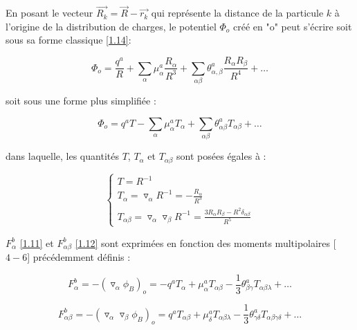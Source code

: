 	En posant le vecteur $\overrightarrow{R_{k}}= \overrightarrow{R} - \overrightarrow{r_{k}}$ qui représente la distance de la particule $k$ à l'origine de la distribution de charges, le potentiel $\Phi_{o}$ créé en "o" peut s'écrire soit sous sa forme classique \ref{1.14}:
	
	\begin{equation}
	\Phi_{o} = \frac{q^{a}}{R} + \sum_{\alpha} \mu_{\alpha}^{a} \frac{R_{\alpha}}{R^{3}} + \sum_{\alpha\beta} \theta_{\alpha,\beta}^{a} \frac{R_{\alpha} R_{\beta}}{R^{4}} + \ldots \label{1.14}
	\end{equation}
	
	soit sous une forme plus simplifiée : 
	
	\begin{equation}
	\Phi_{o} = q^{a} T - \sum_{\alpha} \mu_{\alpha}^{a} T_{\alpha} + \sum_{\alpha\beta} \theta_{\alpha\beta}^{a} T_{\alpha\beta} + \ldots
	\end{equation}
	
	
	dans laquelle, les quantités $T$, $T_{\alpha}$ et $T_{\alpha\beta}$ sont posées égales à :
	
	\begin{equation}
	\begin{cases}
	T = R^{-1} \\
	T_{\alpha} = \triangledown_{\alpha} R^{-1} = - \frac{R_{\alpha}}{R^{3}}\\
	T_{\alpha\beta} = \triangledown_{\alpha} \triangledown_{\beta} R^{-1} = \frac{3R_{\alpha} R_{\beta}- R^{2}\delta_{\alpha\beta}}{R^{5}}
	\end{cases}
	\end{equation}
	
	$F_{\alpha}^{b}$ \ref{1.11} et $F_{\alpha\beta}^{b}$ \ref{1.12} sont exprimées en fonction des moments multipolaires [$4-6$] précédemment définis : 
	
	\begin{equation}
	F_{\alpha}^{b} = -(\triangledown_{\alpha}\phi_{B})_{o} = -q^{a} T_{\alpha} + \mu_{\alpha}^{a} T_{\alpha\beta} - \frac{1}{3} \theta_{\beta\gamma}^{a} T_{\alpha\beta\lambda} + \ldots 
	\end{equation}
	
	\begin{equation}
	F_{\alpha\beta}^{b} = -(\triangledown_{\alpha} \triangledown_{\beta}\phi_{B})_{o} = q^{a} T_{\alpha\beta} + \mu_{\delta}^{a} T_{\alpha\beta\lambda} - \frac{1}{3} \theta_{\gamma\delta}^{a} T_{\alpha\beta\gamma\delta} + \ldots 
	\end{equation}
	
